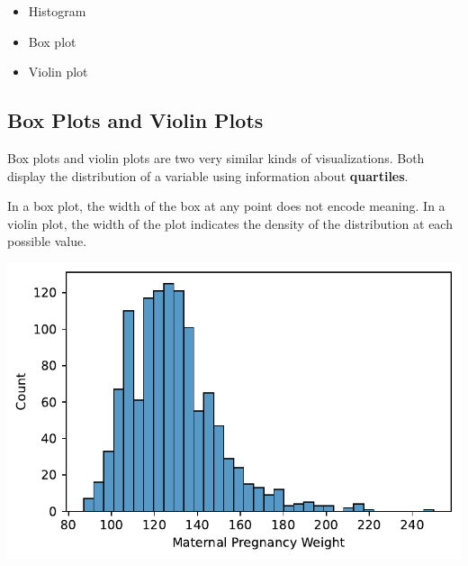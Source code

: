 \documentclass[
  letterpaper,
  DIV=11,
  numbers=noendperiod]{scrreprt}
\newenvironment{Shaded}{\begin{snugshade}}{\end{snugshade}}
\newcommand{\NormalTok}[1]{\textcolor[rgb]{0.00,0.23,0.31}{#1}}
\newcommand{\OperatorTok}[1]{\textcolor[rgb]{0.37,0.37,0.37}{#1}}
\newcommand{\StringTok}[1]{\textcolor[rgb]{0.13,0.47,0.30}{#1}}
\providecommand{\tightlist}{%
  \setlength{\itemsep}{0pt}\setlength{\parskip}{0pt}}\usepackage{longtable,booktabs,array}
\begin{document}
\begin{itemize}
\tightlist
\item
  Histogram
\item
  Box plot
\item
  Violin plot
\end{itemize}

\subsection{Box Plots and Violin
Plots}\label{box-plots-and-violin-plots}

Box plots and violin plots are two very similar kinds of visualizations.
Both display the distribution of a variable using information about
\textbf{quartiles}.

In a box plot, the width of the box at any point does not encode
meaning. In a violin plot, the width of the plot indicates the density
of the distribution at each possible value.

\begin{Shaded}
\end{Shaded}

\includegraphics{visualization_1/visualization_1_files/figure-pdf/cell-8-output-1.pdf}

\begin{Shaded}
\end{Shaded}
\end{document}
